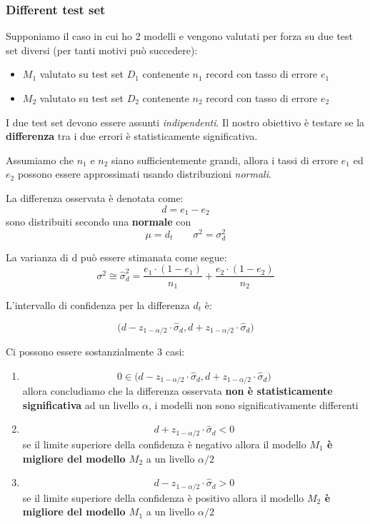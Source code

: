\subsubsection{Different test set}
Supponiamo il caso in cui ho 2 modelli e vengono valutati per forza su due test set diversi (per tanti motivi pu\`o succedere):
\begin{itemize}
	\item $M_1$ valutato su test set $D_1$ contenente $n_1$ record con tasso di errore $e_1$
	\item $M_2$ valutato su test set $D_2$ contenente $n_2$ record con tasso di errore $e_2$
\end{itemize}
I due test set devono essere assunti \textit{indipendenti}. Il nostro obiettivo \`e testare se la \textbf{differenza} tra i due errori \`e statisticamente significativa.

Assumiamo che $n_1$ e $n_2$ siano sufficientemente grandi, allora i tassi di errore $e_1$ ed $e_2$ possono essere approssimati usando distribuzioni \textit{normali}.

La differenza osservata \`e denotata come: 
\[d = e_1 - e_2\]
sono distribuiti secondo una \textbf{normale} con 
\[\mu = d_t \qquad \sigma^2 = \sigma^2_d\] 

La varianza di d pu\`o essere stimanata come segue: 
\[\sigma^2 \cong \hat{\sigma}_d^2 = \frac{e_1 \cdot (1-e_1)}{n_1} + \frac{e_2 \cdot (1-e_2)}{n_2}\]

L'intervallo di confidenza per la differenza $d_t$ \`e: 

\[ \bigl( d - z_{1-\alpha/2} \cdot \hat{\sigma}_d, d + z_{1-\alpha/2} \cdot \hat{\sigma}_d \bigr) \]

Ci possono essere sostanzialmente 3 casi:
\begin{enumerate}
	\item \[0 \in \bigl( d - z_{1-\alpha/2} \cdot \hat{\sigma}_d, d + z_{1-\alpha/2} \cdot \hat{\sigma}_d \bigr)\] allora concludiamo che la differenza osservata \textbf{non \`e statisticamente significativa} ad un livello $\alpha$, i modelli non sono significativamente differenti 
	\item \[d + z_{1-\alpha/2} \cdot \hat{\sigma}_d < 0\] se il limite superiore della confidenza \`e negativo allora il modello \textbf{$M_1$ \`e migliore del modello $M_2$} a un livello $\alpha/2$
	\item \[d - z_{1-\alpha/2} \cdot \hat{\sigma}_d > 0\] se il limite superiore della confidenza \`e positivo allora il modello \textbf{$M_2$ \`e migliore del modello $M_1$} a un livello $\alpha/2$
\end{enumerate}


